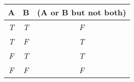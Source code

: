 

\begin{center}
\begin{tabular}{c c||c}
 A  & B & (A or B but not both)\\
\hline
\emph{T} & \emph{T} & \emph{F} \\
\emph{T} & \emph{F} & \emph{T}  \\
\emph{F} & \emph{T} & \emph{T} \\
\emph{F} & \emph{F} & \emph{F} \\
\end{tabular}
\end{center}


